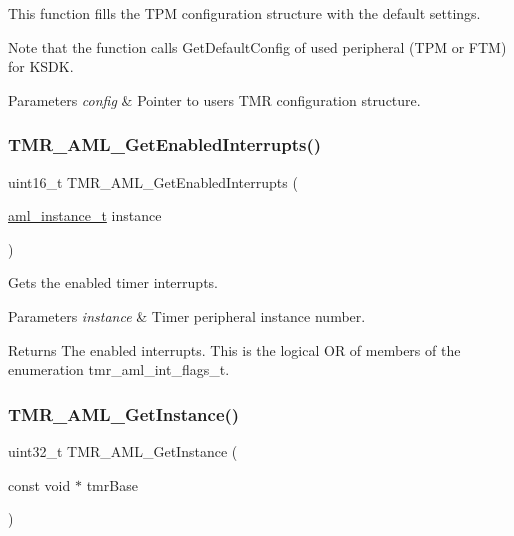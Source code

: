 This function fills the T\+PM configuration structure with the default settings. 

Note that the function calls Get\+Default\+Config of used peripheral (T\+PM or F\+TM) for K\+S\+DK.


\begin{DoxyParams}{Parameters}
{\em config} & Pointer to user\textquotesingle{}s T\+MR configuration structure. \\
\hline
\end{DoxyParams}
\mbox{\label{group__function__group_gadbe5aa98c75287b62c5737f0bae6e68b}} 
\subsubsection{\texorpdfstring{TMR\_AML\_GetEnabledInterrupts()}{TMR\_AML\_GetEnabledInterrupts()}}
{\footnotesize\ttfamily uint16\+\_\+t T\+M\+R\+\_\+\+A\+M\+L\+\_\+\+Get\+Enabled\+Interrupts (\begin{DoxyParamCaption}\item[{\mbox{\hyperlink{common__aml_8h_a562bd37c7d07adcedec5993bc0cd96e5}{aml\+\_\+instance\+\_\+t}}}]{instance }\end{DoxyParamCaption})}



Gets the enabled timer interrupts. 


\begin{DoxyParams}{Parameters}
{\em instance} & Timer peripheral instance number.\\
\hline
\end{DoxyParams}
\begin{DoxyReturn}{Returns}
The enabled interrupts. This is the logical OR of members of the enumeration tmr\+\_\+aml\+\_\+int\+\_\+flags\+\_\+t. 
\end{DoxyReturn}
\mbox{\label{group__function__group_gabedb43ac302eff10bd4877838457a108}} 
\subsubsection{\texorpdfstring{TMR\_AML\_GetInstance()}{TMR\_AML\_GetInstance()}}
{\footnotesize\ttfamily uint32\+\_\+t T\+M\+R\+\_\+\+A\+M\+L\+\_\+\+Get\+Instance (\begin{DoxyParamCaption}\item[{const void $\ast$}]{tmr\+Base }\end{DoxyParamCaption})}




